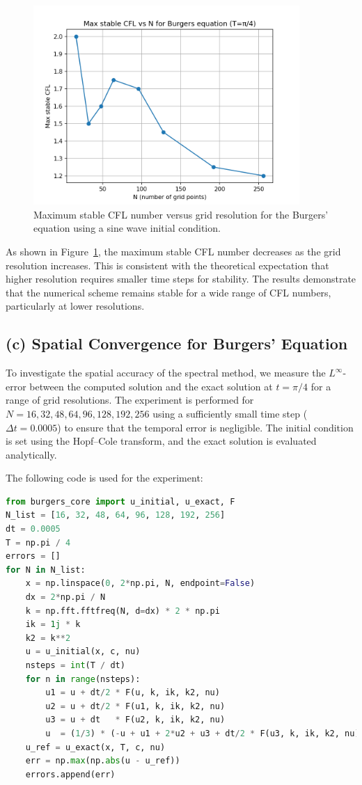 \documentclass{article}
\begin{document}
\begin{figure}[htbp]
    \centering
    \includegraphics[width=0.9\textwidth]{figure/burgers_cfl_stability.png}
    \caption{Maximum stable CFL number versus grid resolution for the Burgers' equation using a sine wave initial condition.}
    \label{fig:burgers_cfl_stability}
\end{figure}

As shown in Figure~\ref{fig:burgers_cfl_stability}, the maximum stable CFL number decreases as the grid resolution increases. This is consistent with the theoretical expectation that higher resolution requires smaller time steps for stability. The results demonstrate that the numerical scheme remains stable for a wide range of CFL numbers, particularly at lower resolutions.

\subsection*{(c) Spatial Convergence for Burgers' Equation}
To investigate the spatial accuracy of the spectral method, we measure the $L^\infty$-error between the computed solution and the exact solution at $t = \pi/4$ for a range of grid resolutions. The experiment is performed for $N = 16, 32, 48, 64, 96, 128, 192, 256$ using a sufficiently small time step ($\Delta t = 0.0005$) to ensure that the temporal error is negligible. The initial condition is set using the Hopf--Cole transform, and the exact solution is evaluated analytically.

The following code is used for the experiment:

\begin{lstlisting}[language=Python]
from burgers_core import u_initial, u_exact, F
N_list = [16, 32, 48, 64, 96, 128, 192, 256]
dt = 0.0005
T = np.pi / 4
errors = []
for N in N_list:
    x = np.linspace(0, 2*np.pi, N, endpoint=False)
    dx = 2*np.pi / N
    k = np.fft.fftfreq(N, d=dx) * 2 * np.pi
    ik = 1j * k
    k2 = k**2
    u = u_initial(x, c, nu)
    nsteps = int(T / dt)
    for n in range(nsteps):
        u1 = u + dt/2 * F(u, k, ik, k2, nu)
        u2 = u + dt/2 * F(u1, k, ik, k2, nu)
        u3 = u + dt   * F(u2, k, ik, k2, nu)
        u  = (1/3) * (-u + u1 + 2*u2 + u3 + dt/2 * F(u3, k, ik, k2, nu))
    u_ref = u_exact(x, T, c, nu)
    err = np.max(np.abs(u - u_ref))
    errors.append(err)
\end{lstlisting}
\end{document}
